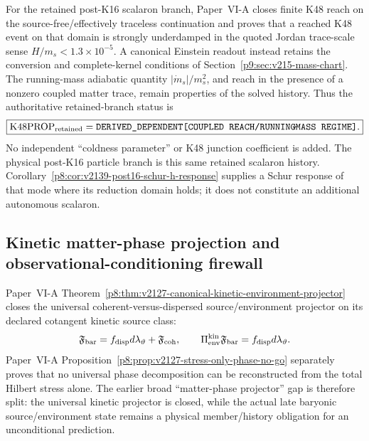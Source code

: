 \documentclass[12pt,a4paper]{article}
\begin{document}
\begin{corollary}
\label{p9:cor:v187-k48-prop-refinement}
For the retained post-K16 scalaron branch, Paper~VI-A closes finite K48 reach
on the source-free/effectively traceless continuation and proves that a reached
K48 event on that domain is strongly underdamped in
the quoted Jordan trace-scale sense \(H/m_s<1.3\times10^{-5}\). A canonical Einstein readout instead retains the conversion and complete-kernel conditions of Section~\ref{p9:sec:v215-mass-chart}. The running-mass adiabatic quantity
\(|\dot m_s|/m_s^2\), and reach in the presence of a nonzero coupled matter
trace, remain properties of the solved history.  Thus the authoritative retained-branch status is
\[
 \boxed{\mathrm{K48PROP}_{\rm retained}
 =\texttt{DERIVED\_DEPENDENT[COUPLED\ REACH/RUNNING\!\!\text{-}\!MASS\ REGIME]}.}
\]
No independent ``coldness parameter'' or K48 junction coefficient is added.
The physical post-K16 particle branch is this same retained scalaron history.
Corollary~\ref{p8:cor:v2139-post16-schur-h-response} supplies a Schur response
of that mode where its reduction domain holds; it does not constitute an
additional autonomous scalaron.
\end{corollary}


\subsection[kinetic matter-phase projection and observational-conditioning firewall]{Kinetic matter-phase projection and\\ observational-conditioning firewall}
\label{p9:sec:v194-matter-phase-sync}
Paper~VI-A Theorem~\ref{p8:thm:v2127-canonical-kinetic-environment-projector}
closes the universal coherent-versus-dispersed source/environment projector on
its declared cotangent kinetic source class:
\[
 \mathfrak F_{\rm bar}
 =f_{\rm disp}d\lambda_\vartheta+\mathfrak F_{\rm coh},
 \qquad
 \Pi_{\rm env}^{\rm kin}\mathfrak F_{\rm bar}
 =f_{\rm disp}d\lambda_\vartheta.
\]
Paper~VI-A Proposition~\ref{p8:prop:v2127-stress-only-phase-no-go} separately
proves that no universal phase decomposition can be reconstructed from the
total Hilbert stress alone.  The earlier broad ``matter-phase projector''
gap is therefore split: the universal kinetic projector is closed, while the
actual late baryonic source/environment state remains a physical
member/history obligation for an unconditional prediction.
\end{document}
